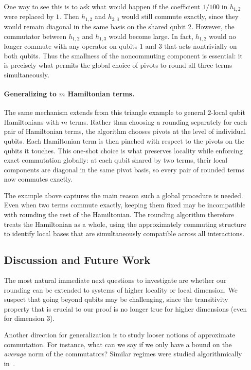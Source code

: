\documentclass[a4paper,onecolumn,11pt]{quantumarticle}
\theoremstyle{plain}
\begin{document}
One way to see this is to ask what would happen if the coefficient
$1/100$ in $h_{1,2}$ were replaced by $1$.  Then $h_{1,2}$ and $h_{2,3}$
would still commute exactly, since they would remain diagonal in the same
basis on the shared qubit $2$.  However, the commutator between $h_{1,2}$
and $h_{1,3}$ would become large.  In fact, $h_{1,2}$ would no longer
commute with any operator on qubits $1$ and $3$ that acts nontrivially on
both qubits.  Thus the smallness of the noncommuting component is
essential: it is precisely what permits the global choice of pivots to
round all three terms simultaneously.

\paragraph{Generalizing to $m$ Hamiltonian terms.}

The same mechanism extends from this triangle example to general
$2$-local qubit Hamiltonians with $m$ terms.  Rather than choosing a
rounding separately for each pair of Hamiltonian terms, the algorithm
chooses pivots at the level of individual qubits.  Each Hamiltonian term
is then pinched with respect to the pivots on the qubits it touches.  This
one-shot choice is what preserves locality while enforcing exact
commutation globally: at each qubit shared by two terms, their local components are diagonal in the same pivot basis, so every pair of rounded terms now commutes exactly.

The example above captures the main reason such a global procedure is
needed.  Even when two terms commute exactly, keeping them fixed may be
incompatible with rounding the rest of the Hamiltonian.  The rounding
algorithm therefore treats the Hamiltonian as a whole, using the
approximately commuting structure to identify local bases that are
simultaneously compatible across all interactions.

\subsection{Discussion and Future Work}
The most natural immediate next questions to investigate are whether our rounding can be extended to systems of higher locality or local dimension. We suspect that going beyond qubits may be challenging, since the transitivity property that is crucial to our proof is no longer true for higher dimensions (even for dimension 3). 

Another direction for generalization is to study looser notions of approximate commutation. For instance, what can we say if we only have a bound on the \emph{average} norm of the commutators? Similar regimes were studied algorithmically in~\cite{schmidhuber2025hamiltoniandecodedquantuminterferometry}. 
\end{document}
